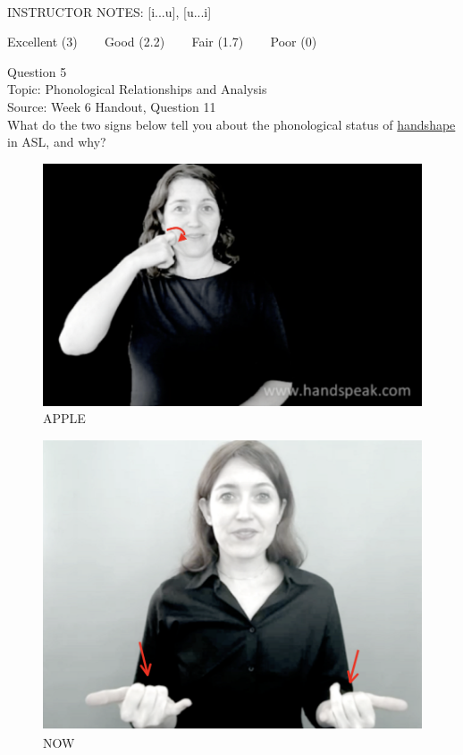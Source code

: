 \documentclass[12pt]{article}
\begin{document}
~\\
INSTRUCTOR NOTES: [i...u], [u...i]


\vfill
Excellent (3) ~~~ Good (2.2) ~~~ Fair (1.7) ~~~ Poor (0)
\newpage

{\large Question 5}\\

Topic: Phonological Relationships and Analysis\\
Source: Week 6 Handout, Question 11\\

What do the two signs below tell you about the phonological status of \underline{handshape} in ASL, and why?\\

\begin{figure}[H]
\includegraphics{../images/asl_apple.png}
\caption{APPLE}
\end{figure}
\begin{figure}[H]
\includegraphics{../images/asl_now.png}
\caption{NOW}
\end{figure}
\end{document}
